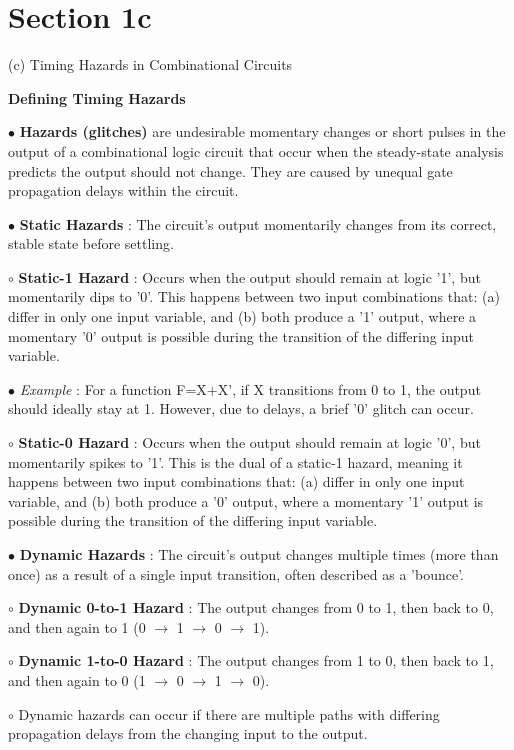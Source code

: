 \documentclass{article}
\begin{document}
\section{Section 1c}

(c) Timing Hazards in Combinational Circuits

\textbf{Defining Timing Hazards}

$\bullet$ \textbf{Hazards (glitches)} are undesirable momentary changes or short pulses in the output of a combinational logic circuit that occur when the steady-state analysis predicts the output should not change. They are caused by unequal gate propagation delays within the circuit.

$\bullet$ \textbf{Static Hazards} : The circuit's output momentarily changes from its correct, stable state before settling.

    $\circ$ \textbf{Static-1 Hazard} : Occurs when the output should remain at logic '1', but momentarily dips to '0'. This happens between two input combinations that: (a) differ in only one input variable, and (b) both produce a '1' output, where a momentary '0' output is possible during the transition of the differing input variable.

        $\bullet$ \textit{Example} : For a function F=X+X', if X transitions from 0 to 1, the output should ideally stay at 1. However, due to delays, a brief '0' glitch can occur.

    $\circ$ \textbf{Static-0 Hazard} : Occurs when the output should remain at logic '0', but momentarily spikes to '1'. This is the dual of a static-1 hazard, meaning it happens between two input combinations that: (a) differ in only one input variable, and (b) both produce a '0' output, where a momentary '1' output is possible during the transition of the differing input variable.

$\bullet$ \textbf{Dynamic Hazards} : The circuit's output changes multiple times (more than once) as a result of a single input transition, often described as a 'bounce'.

    $\circ$ \textbf{Dynamic 0-to-1 Hazard} : The output changes from 0 to 1, then back to 0, and then again to 1 (0 $\rightarrow$ 1 $\rightarrow$ 0 $\rightarrow$ 1).

    $\circ$ \textbf{Dynamic 1-to-0 Hazard} : The output changes from 1 to 0, then back to 1, and then again to 0 (1 $\rightarrow$ 0 $\rightarrow$ 1 $\rightarrow$ 0).

    $\circ$ Dynamic hazards can occur if there are multiple paths with differing propagation delays from the changing input to the output.
\end{document}
